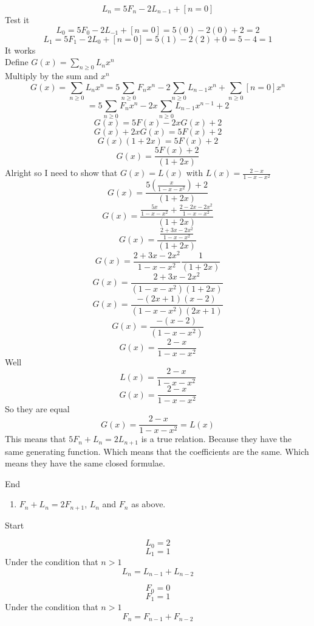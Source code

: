 \documentclass[10pt, AMS Euler]{article}
\begin{document}
\begin{enumerate}[resume]
            $$ L_n = 5F_n  - 2 L_{n-1} + [n=0] $$
            Test it
            $$ L_0 = 5 F_0 - 2 L_{-1} + [n=0] = 5(0) - 2 (0) + 2 = 2 $$
            $$ L_1 = 5 F_1 - 2 L_{0} + [n=0] = 5(1) - 2 (2) + 0 = 5 - 4 = 1 $$
            It works \\
            Define $ G(x) = \sum_{n\geq0} L_n x^n $ \\
            Multiply by the sum and $x^n$
            $$ G(x) = \sum_{n\geq0} L_n x^n = 5 \sum_{n\geq0} F_n x^n - 2 \sum_{n\geq0} L_{n-1} x^n + \sum_{n\geq0} [n=0] x^n $$
            $$ = 5 \sum_{n\geq0} F_n x^n - 2x \sum_{n\geq0} L_{n-1} x^{n-1} + 2 $$
            $$ G(x) = 5 F(x) - 2x G(x) + 2 $$
            $$ G(x) + 2x G(x) = 5 F(x) + 2 $$
            $$ G(x) (1 + 2x) = 5 F(x) + 2 $$
            $$ G(x) = \frac{5 F(x) + 2}{(1 + 2x)} $$
            Alright so I need to show that $G(x) = L(x)$ with $ L(x) = \frac{2-x}{ 1 - x - x^2 } $
            $$ G(x) = \frac{5 (\frac{x}{1-x-x^2}) + 2}{(1 + 2x)} $$
            $$ G(x) = \frac{ \frac{5x}{1-x-x^2} + \frac{2-2x-2x^2}{1-x-x^2}}{(1 + 2x)} $$
            $$ G(x) = \frac{ \frac{ 2+ 3x - 2x^2}{1-x-x^2}}{(1 + 2x)} $$
            $$ G(x) = \frac{ 2+ 3x - 2x^2}{1-x-x^2} \frac{1}{(1 + 2x)} $$
            $$ G(x) = \frac{ 2+ 3x - 2x^2}{(1-x-x^2)(1 + 2x)} $$
            $$ G(x) = \frac{ -(2x+1)(x-2)}{(1-x-x^2)(2x + 1 )} $$
            $$ G(x) = \frac{ -(x-2)}{(1-x-x^2)} $$
            $$ G(x) = \frac{ 2-x}{1-x-x^2} $$
            Well 
            $$ L(x) = \frac{2-x}{ 1 - x - x^2 } $$
            $$ G(x) = \frac{ 2-x}{1-x-x^2} $$
            So they are equal
            $$ G(x) = \frac{ 2-x}{1-x-x^2} = L(x) $$
            This means that $5F_n + L_n = 2L_{n+1} $ is a true relation. Because they have the same generating function. Which means that the coefficients are the same. Which means they have the same closed formulae.
            
            End

            \newpage
            \begin{enumerate}[resume]
			\item $F_n +L_n =2F_{n+1}$, $L_n$ and $F_n$ as above.
	    \end{enumerate} 

            Start
            
            $$ L_0 = 2 $$
            $$ L_1 = 1 $$
            Under the condition that $n>1$
            $$ L_n = L_{n-1} + L_{n-2} $$

            $$ F_0 = 0 $$
            $$ F_1 = 1 $$
            Under the condition that $n>1$
            $$ F_n = F_{n-1} + F_{n-2} $$


\end{enumerate}
\end{document}
